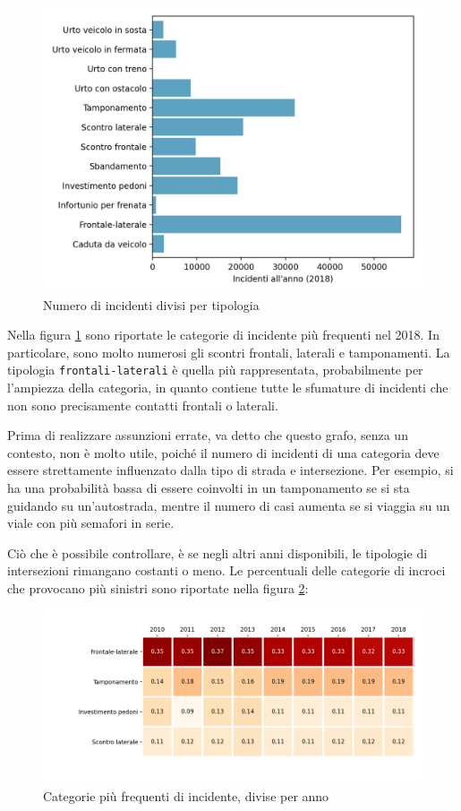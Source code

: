 \documentclass[a4paper,12pt]{report}
\newcommand{\columnstyle}[1]{\texttt{#1}}
\begin{document}
\begin{figure}
    \hfill\includegraphics[width=0.7\linewidth]{../src/incidenti/incidenti_senza_coords/localizzazione_incidente/tipo_incidente.png}\hspace*{\fill}
    \caption{Numero di incidenti divisi per tipologia}
    \label{fig:tipo-incidente}
\end{figure}

Nella figura \ref{fig:tipo-incidente} sono riportate le categorie di 
incidente più frequenti nel 2018. 
In particolare, sono molto numerosi gli scontri frontali, laterali e tamponamenti. 
La tipologia \columnstyle{frontali-laterali} è quella più rappresentata, 
probabilmente per l'ampiezza della categoria, in quanto contiene 
tutte le sfumature di incidenti che non sono 
precisamente contatti frontali o laterali. 

Prima di realizzare assunzioni errate, va detto che questo grafo, senza un contesto, 
non è molto utile, poiché il numero di incidenti di una categoria deve 
essere strettamente influenzato dalla tipo di strada e intersezione. 
Per esempio, si ha una probabilità bassa di essere coinvolti in un tamponamento 
se si sta guidando su un'autostrada, mentre il numero di casi aumenta se si viaggia 
su un viale con più semafori in serie. 

Ciò che è possibile controllare, è se negli altri anni disponibili, le 
tipologie di intersezioni rimangano costanti o meno. 
Le percentuali delle categorie di incroci che provocano più sinistri 
sono riportate nella figura \ref{fig:rapporto-tipologie}: 

\begin{figure}
    \includegraphics[width=\linewidth]{../src/incidenti/incidenti_senza_coords/localizzazione_incidente/rapporto_tipologie.png}
    \caption{Categorie più frequenti di incidente, divise per anno}
    \label{fig:rapporto-tipologie}
\end{figure}
\end{document}
